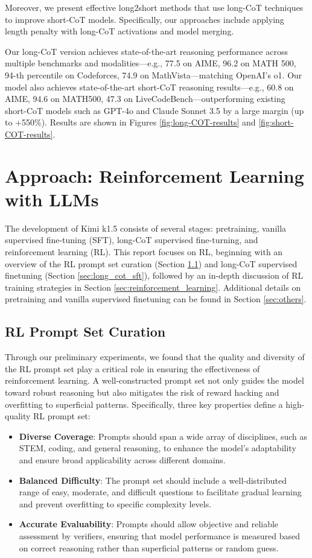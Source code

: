 \documentclass{article}
\begin{document}
Moreover, we present effective long2short methods that use long-CoT techniques to improve short-CoT models. Specifically, our approaches include applying length penalty with long-CoT activations and model merging.

Our long-CoT version achieves state-of-the-art reasoning performance across multiple benchmarks and modalities---e.g., 77.5 on AIME, 96.2 on MATH 500, 94-th percentile on Codeforces, 74.9 on MathVista---matching OpenAI's o1.
Our model also achieves state-of-the-art short-CoT reasoning results---e.g., 60.8 on AIME, 94.6 on MATH500, 47.3 on LiveCodeBench---outperforming existing short-CoT models such as GPT-4o and Claude Sonnet 3.5 by a large margin (up to +550\%). Results are shown in Figures \ref{fig:long-COT-results} and \ref{fig:short-COT-results}.


\section{Approach: Reinforcement Learning with LLMs}
\label{sec:post_training}

The development of Kimi k1.5 consists of several stages: pretraining, vanilla supervised fine-tuning (SFT), long-CoT supervised fine-turning, and reinforcement learning (RL).
This report focuses on RL, beginning with an overview of the RL prompt set curation (Section \ref{sec:rl_prompt}) and long-CoT supervised finetuning (Section \ref{sec:long_cot_sft}), followed by an in-depth discussion of RL training strategies in Section \ref{sec:reinforcement_learning}. 
Additional details on pretraining and vanilla supervised finetuning can be found in Section \ref{sec:others}.


\subsection{RL Prompt Set Curation} 
\label{sec:rl_prompt}
Through our preliminary experiments, we found that the quality and diversity of the RL prompt set play a critical role in ensuring the effectiveness of reinforcement learning. A well-constructed prompt set not only guides the model toward robust reasoning but also mitigates the risk of reward hacking and overfitting to superficial patterns. Specifically, three key properties define a high-quality RL prompt set:
\begin{itemize}
    \item \textbf{Diverse Coverage}: Prompts should span a wide array of disciplines, such as STEM, coding, and general reasoning, to enhance the model’s adaptability and ensure broad applicability across different domains.
    \item \textbf{Balanced Difficulty}: The prompt set should include a well-distributed range of easy, moderate, and difficult questions to facilitate gradual learning and prevent overfitting to specific complexity levels.
    \item \textbf{Accurate Evaluability}: Prompts should allow objective and reliable assessment by verifiers, ensuring that model performance is measured based on correct reasoning rather than superficial patterns or random guess. 
\end{itemize}
\end{document}
